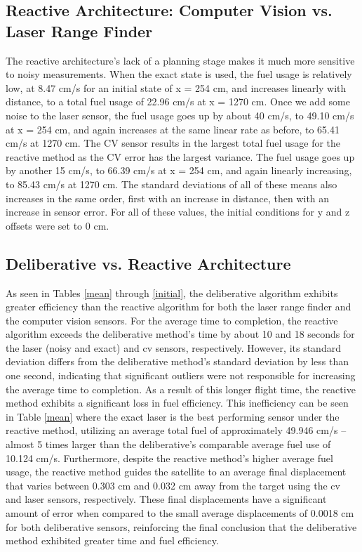 \documentclass[journal, 10pt]{IEEEtran}
\begin{document}
\subsection{Reactive Architecture: Computer Vision vs. Laser Range Finder}
The reactive architecture's lack of a planning stage makes it much more sensitive to noisy measurements. When the exact state is used, the fuel usage is relatively low, at 8.47 cm/s for an initial state of x = 254 cm, and increases linearly with distance, to a total fuel usage of 22.96 cm/s at x = 1270 cm. Once we add some noise to the laser sensor, the fuel usage goes up by about 40 cm/s, to 49.10 cm/s at x = 254 cm, and again increases at the same linear rate as before, to 65.41 cm/s at 1270 cm. The CV sensor results in the largest total fuel usage for the reactive method as the CV error has the largest variance. The fuel usage goes up by another 15 cm/s, to 66.39 cm/s at x = 254 cm, and again linearly increasing, to 85.43 cm/s at 1270 cm. The standard deviations of all of these means also increases in the same order, first with an increase in distance, then with an increase in sensor error. For all of these values, the initial conditions for y and z offsets were set to 0 cm.

\subsection{Deliberative vs. Reactive Architecture}

As seen in Tables \ref{mean} through \ref{initial}, the deliberative algorithm exhibits greater efficiency than the reactive algorithm for both the laser range finder and the computer vision sensors. For the average time to completion, the reactive algorithm exceeds the deliberative method's time by about 10 and 18 seconds for the laser (noisy and exact) and cv sensors, respectively. However, its standard deviation differs from the deliberative method's standard deviation by less than one second, indicating that significant outliers were not responsible for increasing the average time to completion. As a result of this longer flight time, the reactive method exhibits a significant loss in fuel efficiency. This inefficiency can be seen in Table \ref{mean} where the exact laser is the best performing sensor under the reactive method, utilizing an average total fuel of approximately 49.946 cm/s -- almost 5 times larger than the deliberative's comparable average fuel use of 10.124 cm/s. Furthermore, despite the reactive method's higher average fuel usage, the reactive method guides the satellite to an average final displacement that varies between 0.303 cm and 0.032 cm away from the target using the cv and laser sensors, respectively. These final displacements have a significant amount of error when compared to the small average displacements of 0.0018 cm for both deliberative sensors, reinforcing the final conclusion that the deliberative method exhibited greater time and fuel efficiency.
\end{document}
